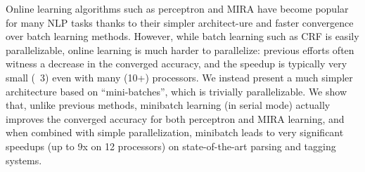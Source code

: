 Online learning algorithms such as perceptron and MIRA have become popular for many NLP tasks thanks to their simpler architect-ure and faster convergence
 over batch learning methods. However, while batch learning such as CRF is
 easily parallelizable, online learning is much harder to parallelize: previous
 efforts often witness a decrease in the converged accuracy, and the speedup is
 typically very small (~3) even with many (10+) processors. We instead present
 a much simpler architecture based on ``mini-batches'', which is trivially
 parallelizable. We show that, unlike previous methods, minibatch learning (in
 serial mode) actually improves the converged accuracy for both perceptron and
 MIRA learning, and when combined with simple parallelization, minibatch leads
 to very significant speedups (up to 9x on 12 processors) on state-of-the-art
 parsing and tagging systems.

